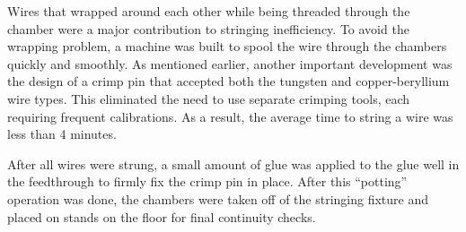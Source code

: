 Wires that wrapped around each other while being threaded through the chamber 
were a major contribution to stringing inefficiency. To avoid the wrapping
problem, a machine was built to spool the wire through the chambers quickly and smoothly.
As mentioned earlier, another important development was the design of a crimp pin 
that accepted both the tungsten and copper-beryllium wire types.    This 
eliminated the need to use separate crimping tools, each requiring frequent 
calibrations.  
As a result, the average time to string a wire was less than 4 minutes.

After all wires were strung,
a small amount of glue was applied to the glue well
in the feedthrough to firmly fix the crimp pin in place.  After this ``potting''
operation was done, the chambers were taken off of the stringing fixture and
placed on stands on the floor for final continuity checks.








